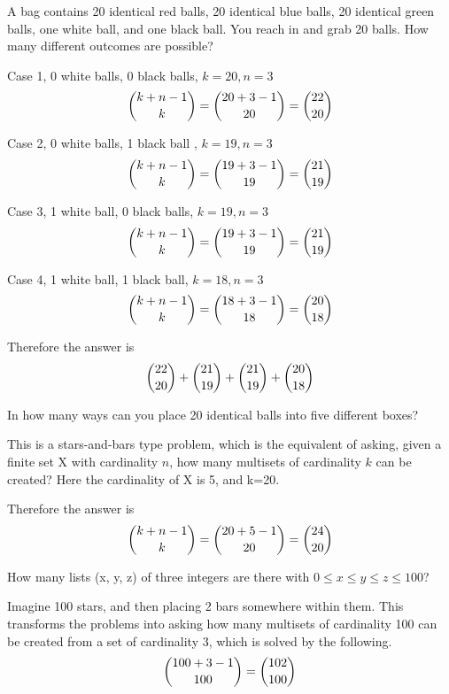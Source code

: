 \documentclass[openany, 11pt]{book}
\begin{document}
\begin{exercise}{}{}A bag contains 20 identical red balls, 20 identical blue
	balls, 20 identical green balls, one white ball, and one black ball. You
	reach in and grab 20 balls. How many different outcomes are possible?
	\begin{alist}
		\item Case 1, 0 white balls, 0 black balls, $k=20, n=3$
		$$ \dbinom{k+n-1}{k} = \dbinom{20+3-1}{20}=\dbinom{22}{20}$$
		\item Case 2, 0 white balls, 1 black ball , $k=19, n=3$
		$$ \dbinom{k+n-1}{k} = \dbinom{19+3-1}{19}=\dbinom{21}{19}$$
		\item Case 3, 1 white ball, 0 black balls, $k=19, n=3$
		$$ \dbinom{k+n-1}{k} = \dbinom{19+3-1}{19}=\dbinom{21}{19}$$
		\item Case 4, 1 white ball, 1 black ball, $k=18, n=3$
		$$ \dbinom{k+n-1}{k} = \dbinom{18+3-1}{18}=\dbinom{20}{18}$$
		\item Therefore the answer is
		$$ \dbinom{22}{20} +\dbinom{21}{19} +\dbinom{21}{19} +\dbinom{20}{18}$$
	\end{alist}
\end{exercise}

\begin{exercise}{}{}
	In how many ways can you place 20 identical balls into five
	different boxes?
	\begin{alist}
		\item This is a stars-and-bars type problem, which is the equivalent of asking,
		given a finite set X with cardinality $n$, how many multisets of cardinality
		$k$ can be created? Here the cardinality of X is 5, and k=20.
		\item Therefore the answer is
		$$ \dbinom{k+n-1}{k} = \dbinom{20+5-1}{20}=\dbinom{24}{20}$$
	\end{alist}
\end{exercise}

\begin{exercise}{}{}
	How many lists (x, y, z) of three integers are there with
	$0 \leq x \leq y \leq z \leq 100$?
	\begin{alist}
		\item  Imagine 100 stars, and then placing 2 bars somewhere within them. This
		transforms the problems into asking how many multisets of cardinality 100
		can be created from a set of cardinality 3, which is solved by the
		following.
		$$ \dbinom{100+3-1}{100} = \dbinom{102}{100}$$
	\end{alist}
\end{exercise}
\end{document}
